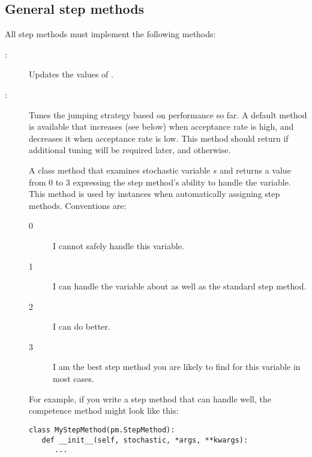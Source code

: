 \subsection*{General step methods} \label{user-gen}

All step methods must implement the following methods:
\begin{description}
   \item[:] Updates the values of .
   \item[:] Tunes the jumping strategy based on performance so far. A default method is available that increases  (see below) when acceptance rate is high, and decreases it when acceptance rate is low. This method should return  if additional tuning will be required later, and  otherwise.
   \item[] A class method that examines stochastic variable $s$ and returns a value from 0 to 3 expressing the step method's ability to handle the variable. This method is used by  instances when automatically assigning step methods. Conventions are:
   \begin{description}
      \item[0] I cannot safely handle this variable. 
      \item[1] I can handle the variable about as well as the standard  step method.
      \item[2] I can do better.
      \item[3] I am the best step method you are likely to find for this variable in most cases.
   \end{description}
   For example, if you write a step method that can handle  well, the competence method might look like this:
\begin{verbatim}
class MyStepMethod(pm.StepMethod):
   def __init__(self, stochastic, *args, **kwargs):
      ...
   

\end{verbatim}
\end{description}
